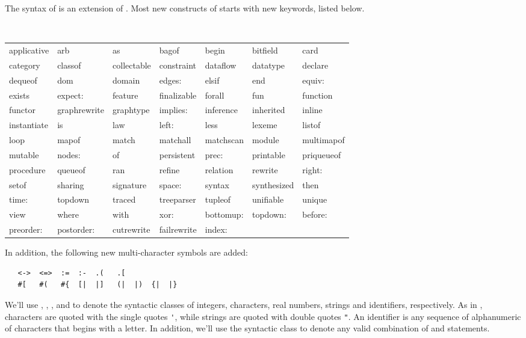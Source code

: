 The syntax of \Prop{} is an extension of \Cpp.  Most new constructs
of \Prop{} starts with new keywords, listed below.  
\begin{center}
\tt
\begin{tabular}{lllllll}
applicative & arb & as & bagof & begin & bitfield & card \\
category & classof & collectable & constraint & dataflow & datatype & declare \\
dequeof & dom & domain & edges: & elsif & end & equiv: \\
exists & expect: & feature & finalizable & forall & fun & function \\
functor & graphrewrite & graphtype & implies: & inference & inherited & inline \\
instantiate & is & law & left: & less & lexeme & listof \\
loop & mapof & match & matchall & matchscan & module & multimapof \\
mutable & nodes: & of & persistent & prec: & printable & priqueueof \\
procedure & queueof & ran & refine & relation & rewrite & right: \\
setof & sharing & signature & space: & syntax & synthesized & then \\
time: & topdown & traced & treeparser & tupleof & unifiable & unique \\
view & where & with & xor: & bottomup: & topdown: & before: \\
preorder: & postorder: & cutrewrite & failrewrite & index: \\
\end{tabular}
\end{center}

   In addition, the following new multi-character symbols are added:
\begin{verbatim}
   <->  <=>  :=  :-  .(   .[
   #[   #(   #{  [|  |]   (|  |)  {|  |} 
\end{verbatim}



We'll use , , ,  
and  to denote the syntactic classes of 
integers, characters, real numbers, strings and identifiers, respectively.
As in \Cpp, characters are quoted with the single quotes \verb|'|, while
strings are quoted with double quotes \verb|"|.  An identifier is
any sequence of alphanumeric of characters that begins with a letter.
In addition, we'll use the syntactic class
 to denote any valid combination of \Cpp{} and \Prop{}
statements.

